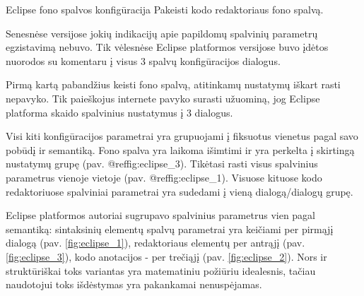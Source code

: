 \begin{xcase}{Eclipse fono spalvos konfigūracija}
  \xcgoal
  {
    Pakeisti kodo redaktoriaus fono spalvą.
  }
  
  \xctools
  {
    Senesnėse versijose jokių indikacijų apie papildomų spalvinių parametrų egzistavimą nebuvo.
    Tik vėlesnėse Eclipse platformos versijose buvo įdėtos nuorodos su komentaru į visus 3
    spalvų konfigūracijos dialogus.
  }
  
  \xcresult
  {
    Pirmą kartą pabandžius keisti fono spalvą, atitinkamų nustatymų iškart rasti nepavyko.
    Tik paieškojus internete pavyko surasti užuominą, jog Eclipse platforma skaido spalvinius
    nustatymus į 3 dialogus.
  }
  
  \xcprinciples
  {
    {
      Visi kiti konfigūracijos parametrai yra grupuojami į fiksuotus vienetus pagal savo pobūdį 
      ir semantiką.
    }
    {
      Fono spalva yra laikoma išimtimi ir yra perkelta į skirtingą nustatymų grupę (pav. @ref{fig:eclipse_3}).
    }
    {
      Tikėtasi rasti visus spalvinius parametrus vienoje vietoje (pav. @ref{fig:eclipse_1}).
      Visuose kituose kodo redaktoriuose spalviniai parametrai yra sudedami į vieną 
      dialogą/dialogų grupę.
    }
  }
  
  \xcthoughts
  {
    Eclipse platformos autoriai sugrupavo spalvinius parametrus vien pagal semantiką: 
    sintaksinių elementų spalvų parametrai yra keičiami per pirmąjį dialogą (pav. \ref{fig:eclipse_1}), redaktoriaus
    elementų per antrąjį (pav. \ref{fig:eclipse_3}), kodo anotacijos - per trečiąjį (pav. \ref{fig:eclipse_2}). Nors ir struktūriškai toks variantas
    yra matematiniu požiūriu idealesnis, tačiau naudotojui toks išdėstymas yra pakankamai
    nenuspėjamas.
  }
\end{xcase}
